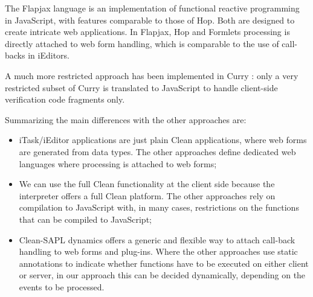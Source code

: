 The \textsf{Flapjax} language \cite{FLAPJAX} is an implementation of functional reactive programming in \textsf{JavaScript}, with features comparable to those of \textsf{Hop}. Both are designed to create intricate web applications. In \textsf{Flapjax}, \textsf{Hop} and \textsf{Formlets} processing is directly attached to web form handling, which is comparable to the use of call-backs in \textsf{iEditors}. 

A much more restricted approach has been implemented in \textsf{Curry} \cite{CURRY}: only a very restricted subset of \textsf{Curry} is translated to \textsf{JavaScript} to handle client-side verification code fragments only.

Summarizing the main differences with the other approaches are:
\begin{itemize}
	\item \textsf{iTask}/\textsf{iEditor} applications are just plain \textsf{Clean} applications, where web forms are generated from data types. The other approaches define dedicated web languages where processing is attached to web forms;
	\item We can use the full \textsf{Clean} functionality at the client side because the \Sapl interpreter offers a full Clean platform. The other approaches rely on compilation to \textsf{JavaScript} with, in many cases, restrictions on the functions that can be compiled to \textsf{JavaScript};
	\item \textsf {Clean-SAPL} dynamics offers a generic and flexible way to attach call-back handling to web forms and plug-ins. 
	Where the other approaches use static annotations to indicate whether functions have to be executed on either client or server, in our approach this can be decided dynamically, depending on the events to be processed.
\end{itemize}

